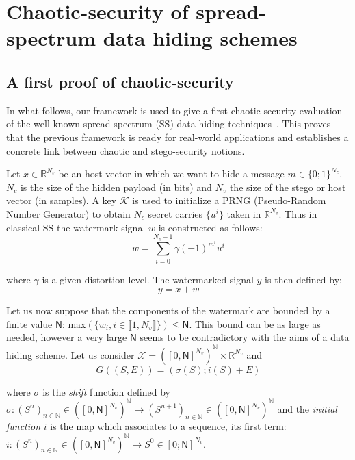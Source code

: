 \documentclass{llncs}
\begin{document}
\section{Chaotic-security of spread-spectrum data hiding schemes}
\label{SS}

\subsection{A first proof of chaotic-security}
\label{spread}






In what follows, our framework is used to give a first chaotic-security evaluation of the well-known spread-spectrum (SS) data hiding techniques~\cite{Cayre2008}. This proves that the previous framework is ready for real-world applications and establishes a concrete link between chaotic and stego-security notions.

\medskip

Let $x \in \mathds{R}^{N_v}$ be an host vector in which we want to hide a message $m\in \{0;1\}^{N_c}$. $N_c$ is the size of the hidden payload (in bits) and $N_v$ the size of the stego or host vector (in samples). A key $\mathcal{K}$ is used to initialize a PRNG (Pseudo-Random Number Generator) to obtain $N_c$ secret carries $\{u^i\}$ taken in $\mathds{R}^{N_v}$. Thus in classical SS the watermark signal $w$ is constructed as follows:
\begin{equation}
\displaystyle{w = \sum_{i=0}^{N_c-1} \gamma (-1)^{m^i} u^i}
\end{equation}

\noindent where $\gamma$ is a given distortion level. The watermarked signal $y$ is then defined by:
\begin{equation}
y = x + w
\end{equation}

Let us now suppose that the components of the watermark are bounded by a finite value $\mathsf{N}$: max$\left(\{ w_i, i \in \llbracket 1, N_v \rrbracket \}\right) \leqslant \mathsf{N}$. This bound can be as large as needed, however a very large $\mathsf{N}$ seems to be contradictory with the aims of a data hiding scheme.
Let us consider $\mathcal{X}=\left(\left[0,\mathsf{N}\right]^{N_v}\right)^\mathds{N}\times \mathds{R}^{N_v}$ and
\begin{equation}
G((S,E)) = (\sigma(S) ; i(S) + E)
\end{equation}

\noindent where $\sigma$ is the \emph{shift} function defined by $\sigma :(S^{n})_{n\in \mathds{N}}\in \left(\left[0,\mathsf{N}\right]^{N_v}\right)^\mathds{N} \rightarrow (S^{n+1})_{n\in \mathds{N}}\in  \left(\left[0,\mathsf{N}\right]^{N_v}\right)^\mathds{N} $ and the \emph{initial function} $i$ is the map which associates to a sequence, its first term: $i:(S^{n})_{n\in \mathds{N}}\in  \left(\left[0,\mathsf{N}\right]^{N_v}\right)^\mathds{N}\rightarrow S^{0}\in  [0;\mathsf{N}]^{N_v}$.
\end{document}
